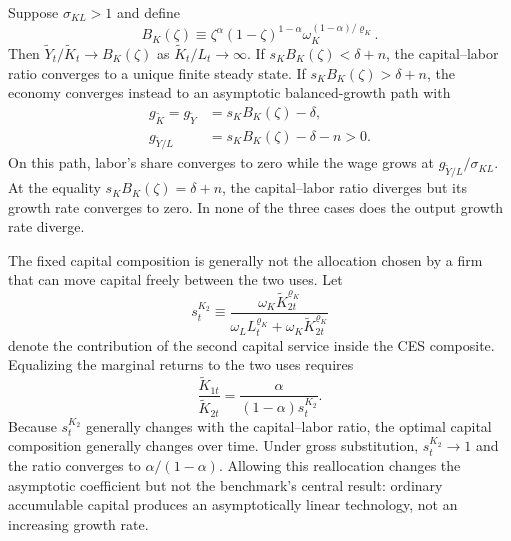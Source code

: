 \begin{conditionalresult}
\label{cond:capital-deepening-benchmark}
Suppose $\sigma_{KL}>1$ and define
\begin{equation}
    B_K(\zeta)
    \equiv
    \zeta^\alpha(1-\zeta)^{1-\alpha}
    \omega_K^{(1-\alpha)/\varrho_K}.
    \label{eq:capital-benchmark-ak-coefficient}
\end{equation}
Then $\widetilde Y_t/\widetilde K_t\to B_K(\zeta)$ as
$\widetilde K_t/L_t\to\infty$. If
$s_KB_K(\zeta)<\delta+n$, the capital--labor ratio converges to a unique finite
steady state. If $s_KB_K(\zeta)>\delta+n$, the economy converges instead to an
asymptotic balanced-growth path with
\begin{align}
    g_{\widetilde K}
    =g_{\widetilde Y}
    &=s_KB_K(\zeta)-\delta,
    \label{eq:capital-benchmark-aggregate-growth}\\
    g_{\widetilde Y/L}
    &=s_KB_K(\zeta)-\delta-n>0.
    \label{eq:capital-benchmark-per-capita-growth}
\end{align}
On this path, labor's share converges to zero while the wage grows at
$g_{\widetilde Y/L}/\sigma_{KL}$. At the equality
$s_KB_K(\zeta)=\delta+n$, the capital--labor ratio diverges but its growth rate
converges to zero. In none of the three cases does the output growth rate diverge.
\end{conditionalresult}

The fixed capital composition is generally not the allocation chosen by a firm that
can move capital freely between the two uses. Let
\begin{equation}
    s^{K_2}_t
    \equiv
    \frac{\omega_K\widetilde K_{2t}^{\varrho_K}}
    {\omega_LL_t^{\varrho_K}
    +\omega_K\widetilde K_{2t}^{\varrho_K}}
    \label{eq:capital-benchmark-inner-share}
\end{equation}
denote the contribution of the second capital service inside the CES composite.
Equalizing the marginal returns to the two uses requires
\begin{equation}
    \frac{\widetilde K_{1t}}{\widetilde K_{2t}}
    =
    \frac{\alpha}{(1-\alpha)s^{K_2}_t}.
    \label{eq:capital-benchmark-optimal-allocation}
\end{equation}
Because $s^{K_2}_t$ generally changes with the capital--labor ratio, the optimal
capital composition generally changes over time. Under gross substitution,
$s^{K_2}_t\to1$ and the ratio converges to $\alpha/(1-\alpha)$. Allowing this
reallocation changes the asymptotic coefficient but not the benchmark's central
result: ordinary accumulable capital produces an asymptotically linear technology,
not an increasing growth rate.

